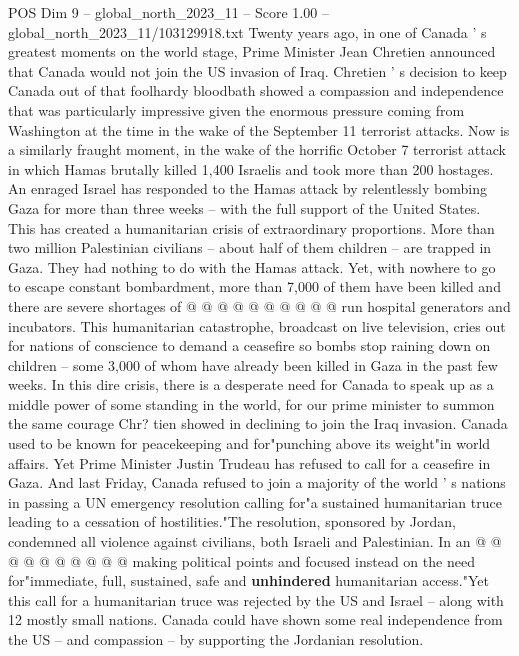 \begin{textsample}{POS Dim 9 – global\_north\_2023\_11 – Score 1.00 – global\_north\_2023\_11/103129918.txt}  \label{ex:f9_pos_159}
Twenty years ago, in one of Canada ' s greatest moments on the world stage, Prime Minister Jean Chretien announced that Canada would not join the US invasion of Iraq.
Chretien ' s decision to keep Canada out of that foolhardy bloodbath showed a compassion and independence that was particularly impressive given the enormous pressure coming from Washington at the time in the wake of the September 11 terrorist attacks.
Now is a similarly fraught moment, in the wake of the horrific October 7 terrorist attack in which Hamas brutally killed 1,400 Israelis and took more than 200 hostages.
An enraged Israel has responded to the Hamas attack by relentlessly bombing Gaza for more than three weeks -- with the full support of the United States.
This has created a humanitarian crisis of extraordinary proportions.
More than two million Palestinian civilians -- about half of them children -- are trapped in Gaza.
They had nothing to do with the Hamas attack.
Yet, with nowhere to go to escape constant bombardment, more than 7,000 of them have been killed and there are severe shortages of @ @ @ @ @ @ @ @ @ @ run hospital generators and incubators.
This humanitarian catastrophe, broadcast on live television, cries out for nations of conscience to demand a ceasefire so bombs stop raining down on children -- some 3,000 of whom have already been killed in Gaza in the past few weeks.
In this dire crisis, there is a desperate need for Canada to speak up as a middle power of some standing in the world, for our prime minister to summon the same courage Chr? tien showed in declining to join the Iraq invasion.
Canada used to be known for peacekeeping and for"punching above its weight"in world affairs.
Yet Prime Minister Justin Trudeau has refused to call for a ceasefire in Gaza.
And last Friday, Canada refused to join a majority of the world ' s nations in passing a UN emergency resolution calling for"a sustained humanitarian truce leading to a cessation of hostilities."The resolution, sponsored by Jordan, condemned all violence against civilians, both Israeli and Palestinian.
In an @ @ @ @ @ @ @ @ @ @ making political points and focused instead on the need for"immediate, full, sustained, safe and \textbf{unhindered} humanitarian access."Yet this call for a humanitarian truce was rejected by the US and Israel -- along with 12 mostly small nations.
Canada could have shown some real independence from the US -- and compassion -- by supporting the Jordanian resolution.

\end{textsample}

